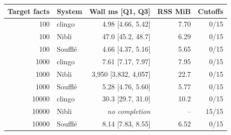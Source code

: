 \begin{tabular}{rlrrr}
\toprule
Target facts & System & Wall ms [Q1, Q3] & RSS MiB & Cutoffs \\
\midrule
100 & clingo & 4.98 [4.66, 5.42] & 7.70 & 0/15 \\
100 & Nibli & 47.0 [45.2, 48.7] & 6.29 & 0/15 \\
100 & Souffl\'e & 4.66 [4.37, 5.16] & 5.65 & 0/15 \\
1000 & clingo & 7.61 [7.17, 7.97] & 7.95 & 0/15 \\
1000 & Nibli & 3,950 [3,832, 4,057] & 22.7 & 0/15 \\
1000 & Souffl\'e & 5.28 [4.76, 5.60] & 5.77 & 0/15 \\
10000 & clingo & 30.3 [29.7, 31.0] & 10.2 & 0/15 \\
10000 & Nibli & \textit{no completion} & -- & 15/15 \\
10000 & Souffl\'e & 8.14 [7.83, 8.55] & 6.52 & 0/15 \\
\bottomrule
\end{tabular}
